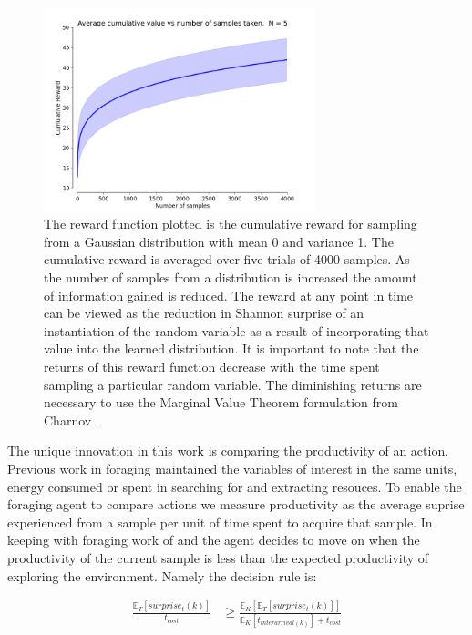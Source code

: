 \begin{figure}[htpd!]
	\centering
	\includegraphics[width=0.7\textwidth]{images/cumulative-reward.png}
	\caption{The reward function plotted is the cumulative reward for sampling from a Gaussian distribution with mean 0 and variance 1.  The cumulative reward is averaged over five trials of 4000 samples.  As the number of samples from a distribution is increased the amount of information gained is reduced.  The reward at any point in time can be viewed as the reduction in Shannon surprise of an instantiation of the random variable as a result of incorporating that value into the learned distribution.  It is important to note that the returns of this reward function decrease with the time spent sampling a particular random variable.  The diminishing returns are necessary to use the Marginal Value Theorem formulation from Charnov \cite{charnov1973optimal}.}
	\label{fig:reward}
\end{figure}

The unique innovation in this work is comparing the productivity of an action.  Previous work in foraging maintained the variables of interest in the same units, energy consumed or spent in searching for and extracting resouces.  To enable the foraging agent to compare actions we measure productivity as the average suprise experienced from a sample per unit of time spent to acquire that sample.  In keeping with foraging work of \cite{charnov1973optimal} and \cite{pirolli1999information} the agent decides to move on when the productivity of the current sample is less than the expected productivity of exploring the environment.  Namely the decision rule is:

\begin{align*}
	\frac{\mathbb{E}_{T}\left[surprise_{t}\left(k\right)\right]}{t_{cost}} &\geq \frac{\mathbb{E}_{K}\left[\mathbb{E}_{T}\left[surprise_{t}\left(k\right)\right]\right]}{\mathbb{E}_{K}\left[t_{interarrival(k)}\right] + t_{cost}}\\
\end{align*}

